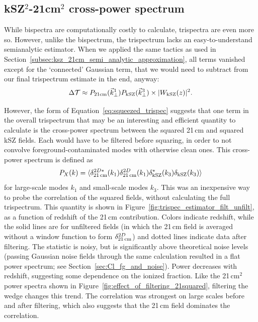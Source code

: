 \subsection{kSZ$^2$-21cm$^2$ cross-power spectrum}

While bispectra are computationally costly to calculate, trispectra are even more so. However, unlike the bispectrum, the trispectrum lacks an easy-to-understand semianalytic estimator. When we applied the same tactics as used in Section~\ref{subsec:ksz_21cm_semi_analytic_approximation}, all terms vanished except for the `connected' Gaussian term, that we would need to subtract from our final trispectrum estimate in the end, anyway:
\begin{equation}
\Delta\mathcal{T} \approx P_{\rm 21cm}(\vec{k}^1_{\perp})P_{\rm kSZ}(\vec{k}^3_{\perp}) \times |W_{\rm kSZ}(z)|^2.
\end{equation}

However, the form of Equation~\ref{eq:squeezed_trispec} suggests that one term in the overall trispectrum that may be an interesting and efficient quantity to calculate is the cross-power spectrum between the squared 21\,cm and squared kSZ fields. Each would have to be filtered before squaring, in order to not convolve foreground-contaminated modes with otherwise clean ones. This cross-power spectrum is defined as
\begin{equation}
P_X(k) = \langle \delta^{2D*}_{\rm 21\,cm}(k_1)\delta^{2D}_{\rm 21\,cm}(k_1) \delta^*_{\rm kSZ}(k_3) \delta_{\rm kSZ}(k_3) \rangle
\end{equation}
for large-scale modes $k_1$ and small-scale modes $k_3$. This was an inexpensive way to probe the correlation of the squared fields, without calculating the full trispectrum. This quantity is shown in Figure~\ref{fig:trispec_estimator_filt_unfilt}, as a function of redshift of the 21\,cm contribution. Colors indicate redshift, while the solid lines are for unfiltered fields (in which the 21\,cm field is averaged without a window function to form $\delta^{2D}_{\rm 21\,cm}$) and dotted lines indicate data after filtering. The statistic is noisy, but is significantly above theoretical noise levels (passing Gaussian noise fields through the same calculation resulted in a flat power spectrum; see Section~\ref{sec:Cl_fg_and_noise}). Power decreases with redshift, suggesting some dependence on the ionized fraction. Like the 21\,cm$^2$ power spectra shown in Figure~\ref{fig:effect_of_filtering_21squared}, filtering the wedge changes this trend. The correlation was strongest on large scales before and after filtering, which also suggests that the 21\,cm field dominates the correlation.

